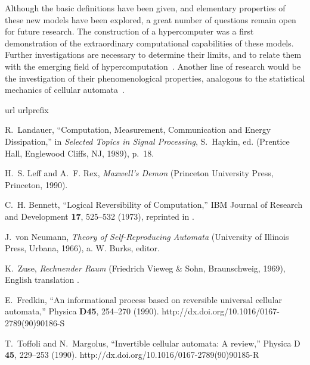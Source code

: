 \documentclass[pre,showpacs,showkeys,preprint]{revtex4}
\theoremstyle{definition}
\begin{document}
Although the basic definitions have been given, and elementary properties of these new models have been explored,
a great number of questions remain open for future research.
The construction of a hypercomputer was a first demonstration of the
extraordinary computational capabilities of these models.
Further investigations are necessary to determine their limits, and to relate them with the
emerging field of hypercomputation~\cite{2002-cal-pav,ord-2002,Davis-2004,Doria-2006,Davis-2006,potgieter-06,1011191}.
Another line of research would be the investigation of their phenomenological properties, analogous
to the statistical mechanics of cellular automata~\cite{wolfram83,wolfram-2002}.

%
%

\begin{thebibliography}{10}
\newcommand{\enquote}[1]{``#1''}
\expandafter\ifx\csname url\endcsname\relax
  \def\url#1{{#1}}\fi
\expandafter\ifx\csname urlprefix\endcsname\relax\def\urlprefix{}\fi

R.~Landauer, \enquote{Computation, Measurement, Communication and Energy
  Dissipation,} in {\em Selected Topics in Signal Processing\/}, S.~Haykin, ed.
   (Prentice Hall, Englewood Cliffs, NJ, 1989), p.~18.

H.~S. Leff and A.~F. Rex, {\em Maxwell's Demon\/} (Princeton University Press,
  Princeton, 1990).

C.~H. Bennett, \enquote{Logical Reversibility of Computation,} IBM Journal of
  Research and Development {\bf 17}, 525--532 (1973), reprinted in \cite[pp.
  197-204]{maxwell-demon}.

J.~von Neumann, {\em Theory of Self-Reproducing Automata\/} (University of
  Illinois Press, Urbana, 1966), a. W. Burks, editor.

K.~Zuse, {\em {R}echnender {R}aum\/} (Friedrich Vieweg \& Sohn, Braunschweig,
  1969), {E}nglish translation \cite{zuse-70}.

E.~Fredkin, \enquote{An informational process based on reversible universal
  cellular automata,} Physica {\bf D45}, 254--270 (1990).
\newline http://dx.doi.org/10.1016/0167-2789(90)90186-S

T.~Toffoli and N.~Margolus, \enquote{Invertible cellular automata: A review,}
  Physica D {\bf 45}, 229--253 (1990).
\newline http://dx.doi.org/10.1016/0167-2789(90)90185-R


\end{thebibliography}
\end{document}

